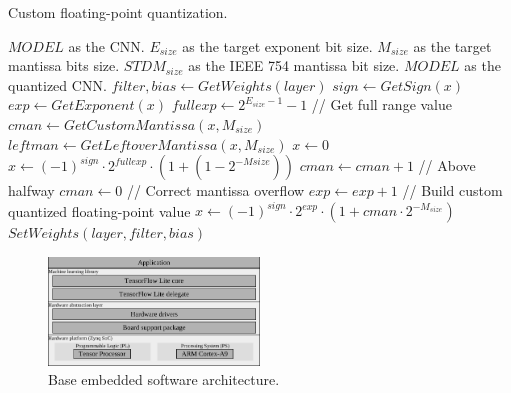 \begin{algorithm}[h!]
	\label{alg:quantize_training}
	\caption{Custom floating-point quantization.}
	\begin{algorithmic}
		\SetAlgoLined
		\renewcommand{\algorithmicrequire}{\textbf{input:}}
		\renewcommand{\algorithmicensure}{\textbf{output:}}
		\REQUIRE $MODEL$ as the CNN.
		\REQUIRE $E_{size}$ as the target exponent bit size.
		\REQUIRE $M_{size}$ as the target mantissa bits size.
		\REQUIRE $STDM_{size}$ as the IEEE 754 mantissa bit size.
		\ENSURE $MODEL$ as the quantized CNN.
		\STATE $filter, bias \gets GetWeights(layer)$
			\STATE $sign \gets GetSign(x)$
			\STATE $exp \gets GetExponent(x)$
			\STATE $fullexp \gets 2^{E_{size}-1}-1$ // Get full range value
			\STATE $cman \gets GetCustomMantissa(x, M_{size})$
			\STATE $leftman \gets GetLeftoverMantissa(x, M_{size})$
				\STATE$x\gets0$
				\STATE$x\gets (-1)^{sign}\cdot2^{fullexp}\cdot(1+(1-2^{-M{size}}))$
			\ELSE
					\STATE $cman \gets cman+1$ // Above halfway
					\STATE $cman \gets 0$ // Correct mantissa overflow
					\STATE $exp \gets exp + 1$
					\ENDIF
				\ENDIF
				\STATE // Build custom quantized floating-point value
				\STATE$x\gets (-1)^{sign}\cdot2^{exp}\cdot(1+cman\cdot2^{-M_{size}})$
			\ENDIF
		\ENDFOR
		\STATE $SetWeights(layer, filter, bias)$
		\ENDIF
		\ENDFOR
	\end{algorithmic}
\end{algorithm}
\begin{figure}[t!]
	\centering
	\includegraphics[width=0.5\textwidth]{../figures/sw_stack.pdf}
	\caption{Base embedded software architecture.}
	\label{fig:sw_stack}
\end{figure}
